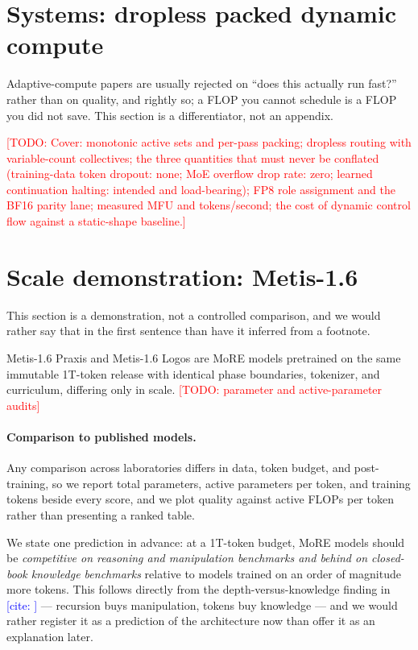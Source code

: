 \documentclass[11pt]{article}
\newcommand{\TODO}[1]{\textcolor{red}{[TODO: #1]}}
\newcommand{\CITE}[1]{\textcolor{blue}{[cite: \detokenize{#1}]}}
\begin{document}
\section{Systems: dropless packed dynamic compute}
\label{sec:systems}

Adaptive-compute papers are usually rejected on ``does this actually run fast?''
rather than on quality, and rightly so; a FLOP you cannot schedule is a FLOP you
did not save. This section is a differentiator, not an appendix.

\TODO{Cover: monotonic active sets and per-pass packing; dropless routing with
variable-count collectives; the three quantities that must never be conflated
(training-data token dropout: none; MoE overflow drop rate: zero; learned
continuation halting: intended and load-bearing); FP8 role assignment and the
BF16 parity lane; measured MFU and tokens/second; the cost of dynamic control
flow against a static-shape baseline.}

\section{Scale demonstration: Metis-1.6}
\label{sec:scale}

This section is a demonstration, not a controlled comparison, and we would rather
say that in the first sentence than have it inferred from a footnote.

Metis-1.6 Praxis and Metis-1.6 Logos are MoRE models pretrained on the same
immutable 1T-token release with identical phase boundaries, tokenizer, and
curriculum, differing only in scale. \TODO{parameter and active-parameter audits}

\paragraph{Comparison to published models.} Any comparison across laboratories
differs in data, token budget, and post-training, so we report total parameters,
active parameters per token, and training tokens beside every score, and we plot
quality against active FLOPs per token rather than presenting a ranked table.

We state one prediction in advance: at a 1T-token budget, MoRE models should be
\emph{competitive on reasoning and manipulation benchmarks and behind on
closed-book knowledge benchmarks} relative to models trained on an order of
magnitude more tokens. This follows directly from the depth-versus-knowledge
finding in \CITE{ouro2025} --- recursion buys manipulation, tokens buy knowledge
--- and we would rather register it as a prediction of the architecture now than
offer it as an explanation later.
\end{document}
